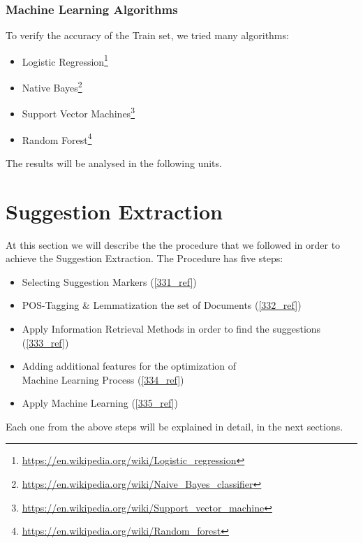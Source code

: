 \subsubsection{Machine Learning Algorithms}\label{3233_ref}
To verify the accuracy of the Train set, we tried many algorithms:\\

\begin{itemize}

	\item Logistic Regression\footnote{\url{https://en.wikipedia.org/wiki/Logistic_regression}}
	\item Native Bayes\footnote{\url{https://en.wikipedia.org/wiki/Naive_Bayes_classifier}}
	\item Support Vector Machines\footnote{\url{https://en.wikipedia.org/wiki/Support_vector_machine}}
	\item Random Forest\footnote{\url{https://en.wikipedia.org/wiki/Random_forest}}\\

\end{itemize}
The results will be analysed in the following units.

\section{Suggestion Extraction}\label{33_ref}
At this section we will describe the the procedure that we followed in order to achieve the Suggestion Extraction. The Procedure has five steps:\\
\begin{itemize}

	\item Selecting Suggestion Markers (\ref{331_ref})
	\item POS-Tagging \& Lemmatization the set of Documents (\ref{332_ref})
	\item Apply Information Retrieval Methods in order to find the suggestions (\ref{333_ref}) 
	\item Adding additional features for the optimization of\\Machine Learning Process (\ref{334_ref})
	\item Apply Machine Learning (\ref{335_ref})\\

\end{itemize}
Each one from the above steps will be explained in detail, in the next sections.

